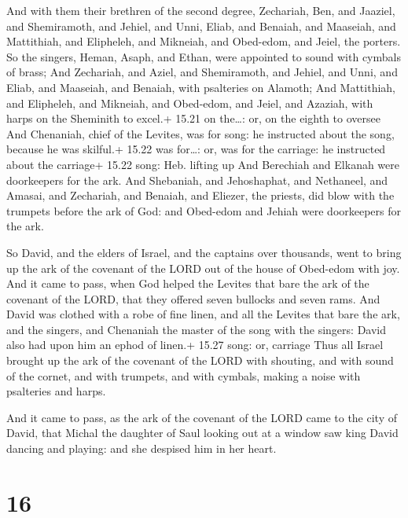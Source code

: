  And with them their brethren of the second degree,
Zechariah, Ben, and Jaaziel, and Shemiramoth, and Jehiel, and Unni,
Eliab, and Benaiah, and Maaseiah, and Mattithiah, and Elipheleh, and
Mikneiah, and Obed-edom, and Jeiel, the porters.  So the
singers, Heman, Asaph, and Ethan, were appointed to sound with cymbals
of brass;  And Zechariah, and Aziel, and Shemiramoth, and
Jehiel, and Unni, and Eliab, and Maaseiah, and Benaiah, with psalteries
on Alamoth;  And Mattithiah, and Elipheleh, and Mikneiah,
and Obed-edom, and Jeiel, and Azaziah, with harps on the Sheminith to
excel.+ 15.21 on the\ldots: or, on the eighth to oversee 
And Chenaniah, chief of the Levites, was for song: he instructed about
the song, because he was skilful.+ 15.22 was for\ldots: or, was for the
carriage: he instructed about the carriage+ 15.22 song: Heb. lifting up
 And Berechiah and Elkanah were doorkeepers for the ark.
 And Shebaniah, and Jehoshaphat, and Nethaneel, and Amasai,
and Zechariah, and Benaiah, and Eliezer, the priests, did blow with the
trumpets before the ark of God: and Obed-edom and Jehiah were
doorkeepers for the ark.

 So David, and the elders of Israel, and the captains
over thousands, went to bring up the ark of the covenant of the LORD out
of the house of Obed-edom with joy.  And it came to pass,
when God helped the Levites that bare the ark of the covenant of the
LORD, that they offered seven bullocks and seven rams.  And
David was clothed with a robe of fine linen, and all the Levites that
bare the ark, and the singers, and Chenaniah the master of the song with
the singers: David also had upon him an ephod of linen.+ 15.27 song: or,
carriage  Thus all Israel brought up the ark of the
covenant of the LORD with shouting, and with sound of the cornet, and
with trumpets, and with cymbals, making a noise with psalteries and
harps.

 And it came to pass, as the ark of the covenant of the
LORD came to the city of David, that Michal the daughter of Saul looking
out at a window saw king David dancing and playing: and she despised him
in her heart.

\hypertarget{section-15}{%
\section{16}\label{section-15}}

